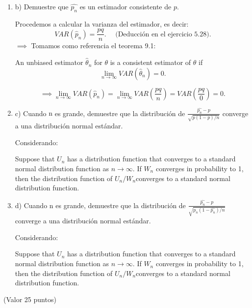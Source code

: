 \begin{enumerate}
\begin{solution}
	\end{solution}
	\item b) Demuestre que $\widehat{p_{n}}$ es un estimador consistente de $p$.
	\begin{solution} 
		Procedemos a calcular la varianza del estimador, es decir: 
		$$VAR(\hat{p}_n)=\frac{pq}{n}. \quad \text{ (Deducción en el ejercicio 5.28).}$$
		$\implies$ Tomamos como referencia el teorema 9.1:
		\begin{tcolorbox}[colback=gray!15,colframe=black!1!black,title=Teorema 9.1]
			An unbiased estimator $\hat{\theta}_n$ for $\theta$ is a consistent estimator of $\theta$ if
			$$\lim_{n\to\infty}VAR(\hat{\theta}_n)=0.$$
		\end{tcolorbox}
	$$\implies \lim_{n\to\infty}VAR(\hat{p}_n)=\lim_{n\to\infty}VAR\left(\frac{pq}{n}\right)=VAR\left(\frac{pq}{0}\right)=0.$$
	\end{solution}
	\item c) Cuando $\mathrm{n}$ es grande, demuestre que la distribución de $\frac{\widehat{p_{n}}-p}{\sqrt{p(1-p) / n}}$ converge a una distribución normal estándar.
	\begin{solution}
		Considerando: \begin{tcolorbox}[colback=gray!15,colframe=black!1!black,title=Teorema 9.3]
			Suppose that $U_n$ has a distribution function that converges to a standard normal distribution function as $n \to \infty$. If $W_n$ converges in probability to 1, then the distribution function of $U_n / W_n $converges to a standard normal distribution function.
			\end{tcolorbox}
	\end{solution}
	\item d) Cuando $\mathrm{n}$ es grande, demuestre que la distribución de $\frac{\widehat{p_{n}}-p}{\sqrt{p_{n}\left(1-\widehat{p_{n}}\right) / n}}$ converge a una distribución normal estándar. 
	\begin{solution}
		Considerando: \begin{tcolorbox}[colback=gray!15,colframe=black!1!black,title=Teorema 9.3]
			Suppose that $U_n$ has a distribution function that converges to a standard normal distribution function as $n \to \infty$. If $W_n$ converges in probability to 1, then the distribution function of $U_n / W_n $converges to a standard normal distribution function.
		\end{tcolorbox}
	\end{solution}
\end{enumerate}
(Valor 25 puntos)
